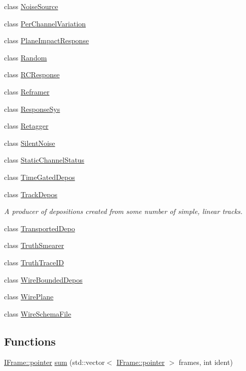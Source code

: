 \begin{DoxyCompactItemize}
class \hyperlink{class_wire_cell_1_1_gen_1_1_noise_source}{Noise\+Source}
\item 
class \hyperlink{class_wire_cell_1_1_gen_1_1_per_channel_variation}{Per\+Channel\+Variation}
\item 
class \hyperlink{class_wire_cell_1_1_gen_1_1_plane_impact_response}{Plane\+Impact\+Response}
\item 
class \hyperlink{class_wire_cell_1_1_gen_1_1_random}{Random}
\item 
class \hyperlink{class_wire_cell_1_1_gen_1_1_r_c_response}{R\+C\+Response}
\item 
class \hyperlink{class_wire_cell_1_1_gen_1_1_reframer}{Reframer}
\item 
class \hyperlink{class_wire_cell_1_1_gen_1_1_response_sys}{Response\+Sys}
\item 
class \hyperlink{class_wire_cell_1_1_gen_1_1_retagger}{Retagger}
\item 
class \hyperlink{class_wire_cell_1_1_gen_1_1_silent_noise}{Silent\+Noise}
\item 
class \hyperlink{class_wire_cell_1_1_gen_1_1_static_channel_status}{Static\+Channel\+Status}
\item 
class \hyperlink{class_wire_cell_1_1_gen_1_1_time_gated_depos}{Time\+Gated\+Depos}
\item 
class \hyperlink{class_wire_cell_1_1_gen_1_1_track_depos}{Track\+Depos}
\begin{DoxyCompactList}\small\item\em A producer of depositions created from some number of simple, linear tracks. \end{DoxyCompactList}\item 
class \hyperlink{class_wire_cell_1_1_gen_1_1_transported_depo}{Transported\+Depo}
\item 
class \hyperlink{class_wire_cell_1_1_gen_1_1_truth_smearer}{Truth\+Smearer}
\item 
class \hyperlink{class_wire_cell_1_1_gen_1_1_truth_trace_i_d}{Truth\+Trace\+ID}
\item 
class \hyperlink{class_wire_cell_1_1_gen_1_1_wire_bounded_depos}{Wire\+Bounded\+Depos}
\item 
class \hyperlink{class_wire_cell_1_1_gen_1_1_wire_plane}{Wire\+Plane}
\item 
class \hyperlink{class_wire_cell_1_1_gen_1_1_wire_schema_file}{Wire\+Schema\+File}
\end{DoxyCompactItemize}
\subsection*{Functions}
\begin{DoxyCompactItemize}
\item 
\hyperlink{class_wire_cell_1_1_i_data_aff870b3ae8333cf9265941eef62498bc}{I\+Frame\+::pointer} \hyperlink{namespace_wire_cell_1_1_gen_a9e70fc8975c3ffb3d2f9fc71bc453516}{sum} (std\+::vector$<$ \hyperlink{class_wire_cell_1_1_i_data_aff870b3ae8333cf9265941eef62498bc}{I\+Frame\+::pointer} $>$ frames, int ident)
\end{DoxyCompactItemize}


